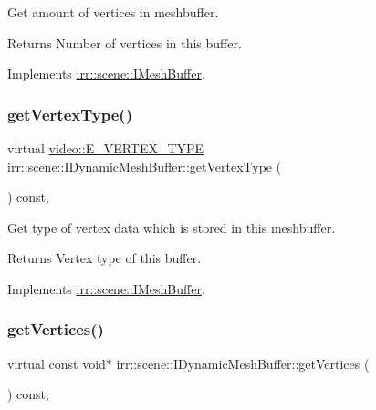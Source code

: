Get amount of vertices in meshbuffer. 

\begin{DoxyReturn}{Returns}
Number of vertices in this buffer. 
\end{DoxyReturn}


Implements \hyperlink{classirr_1_1scene_1_1IMeshBuffer_a77ab285c8c886af8ddeb0371db7bde96}{irr\+::scene\+::\+I\+Mesh\+Buffer}.

\mbox{\label{classirr_1_1scene_1_1IDynamicMeshBuffer_a3e7523774efaf9a177de6396dfdc14e2}} 
\subsubsection{\texorpdfstring{get\+Vertex\+Type()}{getVertexType()}}
{\footnotesize\ttfamily virtual \hyperlink{namespaceirr_1_1video_a0e3b59e025e0d0db0ed2ee0ce904deac}{video\+::\+E\+\_\+\+V\+E\+R\+T\+E\+X\+\_\+\+T\+Y\+PE} irr\+::scene\+::\+I\+Dynamic\+Mesh\+Buffer\+::get\+Vertex\+Type (\begin{DoxyParamCaption}{ }\end{DoxyParamCaption}) const\hspace{0.3cm}{\ttfamily [inline]}, {\ttfamily [virtual]}}



Get type of vertex data which is stored in this meshbuffer. 

\begin{DoxyReturn}{Returns}
Vertex type of this buffer. 
\end{DoxyReturn}


Implements \hyperlink{classirr_1_1scene_1_1IMeshBuffer_a4d7a84ae4416487736f0ed0f519bb4f0}{irr\+::scene\+::\+I\+Mesh\+Buffer}.

\mbox{\label{classirr_1_1scene_1_1IDynamicMeshBuffer_a433e0e8ec301ce898dc373ca65e30e85}} 
\subsubsection{\texorpdfstring{get\+Vertices()}{getVertices()}\hspace{0.1cm}{\footnotesize\ttfamily [1/2]}}
{\footnotesize\ttfamily virtual const void$\ast$ irr\+::scene\+::\+I\+Dynamic\+Mesh\+Buffer\+::get\+Vertices (\begin{DoxyParamCaption}{ }\end{DoxyParamCaption}) const\hspace{0.3cm}{\ttfamily [inline]}, {\ttfamily [virtual]}}



